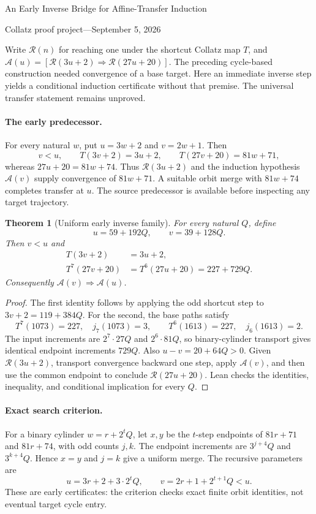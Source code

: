 \documentclass[10pt]{article}
\newtheorem{theorem}{Theorem}
\newcommand{\R}{\mathcal R}
\newcommand{\A}{\mathcal A}
\begin{document}
\begin{center}
{\Large An Early Inverse Bridge for Affine-Transfer Induction}\par\medskip
Collatz proof project\quad---\quad September 5, 2026
\end{center}
Write $\R(n)$ for reaching one under the shortcut Collatz map $T$, and
$\A(u)=[\R(3u+2)\Rightarrow\R(27u+20)]$.
The preceding cycle-based construction needed convergence of a base target.
Here an immediate inverse step yields a conditional induction certificate
without that premise. The universal transfer statement remains unproved.

\paragraph{The early predecessor.}
For every natural $w$, put $u=3w+2$ and $v=2w+1$. Then
\[
 v<u,\qquad T(3v+2)=3u+2,\qquad T(27v+20)=81w+71,
\]
whereas $27u+20=81w+74$.
Thus $\R(3u+2)$ and the induction hypothesis $\A(v)$ supply convergence
of $81w+71$. A suitable orbit merge with $81w+74$ completes transfer at $u$.
The source predecessor is available before inspecting any target trajectory.

\begin{theorem}[Uniform early inverse family]
For every natural $Q$, define
\[
 u=59+192Q,\qquad v=39+128Q.
\]
Then $v<u$ and
\begin{align*}
 T(3v+2)&=3u+2,\\
 T^7(27v+20)&=T^6(27u+20)=227+729Q.
\end{align*}
Consequently $\A(v)\Rightarrow\A(u)$.
\end{theorem}
\begin{proof}
The first identity follows by applying the odd shortcut step to
$3v+2=119+384Q$.
For the second, the base paths satisfy
\[
 T^7(1073)=227,\quad j_7(1073)=3,\qquad
 T^6(1613)=227,\quad j_6(1613)=2.
\]
The input increments are $2^7\cdot27Q$ and $2^6\cdot81Q$,
so binary-cylinder transport gives identical endpoint increments $729Q$.
Also $u-v=20+64Q>0$.
Given $\R(3u+2)$, transport convergence backward one step, apply $\A(v)$,
and then use the common endpoint to conclude $\R(27u+20)$.
Lean checks the identities, inequality, and conditional implication for every $Q$.
\end{proof}

\paragraph{Exact search criterion.}
For a binary cylinder $w=r+2^tQ$, let $x,y$ be the $t$-step endpoints of
$81r+71$ and $81r+74$, with odd counts $j,k$.
The endpoint increments are $3^{j+4}Q$ and $3^{k+4}Q$.
Hence $x=y$ and $j=k$ give a uniform merge. The recursive parameters are
\[
 u=3r+2+3\cdot2^tQ,\qquad
 v=2r+1+2^{t+1}Q<u.
\]
These are early certificates: the criterion checks exact finite orbit identities,
not eventual target cycle entry.
\end{document}
